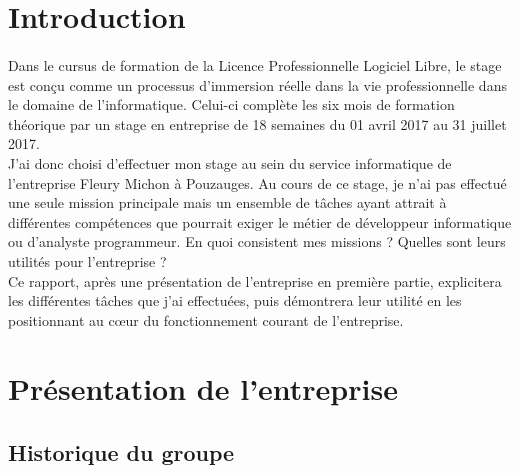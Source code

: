 \documentclass[a4paper,12pt]{extarticle}
\begin{document}
	\clearpage
	
	\section{Introduction}
		\paragraph{}
			
	Dans le cursus de formation de la Licence Professionnelle Logiciel Libre, le stage est conçu comme un processus d’immersion réelle dans la vie professionnelle dans le domaine de l’informatique. Celui-ci complète les six mois de formation théorique par un stage en entreprise de 18 semaines du 01 avril 2017 au 31 juillet 2017.\\
J’ai donc choisi d’effectuer mon stage au sein du service informatique de l’entreprise Fleury Michon à Pouzauges.
Au cours de ce stage, je n’ai pas effectué une seule mission principale mais un ensemble de tâches ayant attrait à différentes compétences que pourrait exiger le métier de développeur informatique ou d’analyste programmeur. En quoi consistent mes missions ? Quelles sont leurs utilités pour l’entreprise ?\\
Ce rapport, après une présentation de l’entreprise en première partie, explicitera les différentes tâches que j’ai effectuées, puis démontrera leur utilité en les positionnant au cœur du fonctionnement courant de l’entreprise.\\

	\clearpage
	
	\section{Présentation de l’entreprise}
	
	\subsection{Historique du groupe}
		\paragraph{}
			
\end{document}
